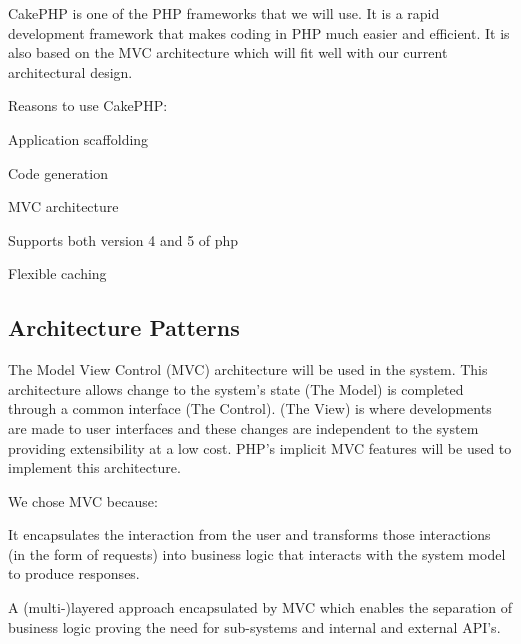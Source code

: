 \documentclass[a4paper,12pt]{report}
\begin{document}
\begin{description}
\item CakePHP is one of the PHP frameworks that we will use. It is a rapid development framework that makes coding in PHP much easier and efficient. It is also based on the MVC architecture which will fit well with our current architectural design. 
\item Reasons to use CakePHP:
\item[$\bullet$]Application scaffolding
\item[$\bullet$]Code generation
\item[$\bullet$] MVC architecture
\item[$\bullet$]Supports both version 4 and 5 of php
\item[$\bullet$]Flexible caching

\end{description}
\subsection{Architecture Patterns}
	\begin{description}
\item The Model View Control (MVC) architecture will be used in the system.
This architecture allows change to the system's state (The Model) is completed through a common interface (The Control). (The View) is where developments are made to user interfaces and these changes are independent to the system providing extensibility at a low cost.
PHP’s implicit MVC features will be used to implement this architecture. 
\item We chose MVC because:
\item[$\bullet$] It encapsulates the interaction from the user and transforms those interactions (in the form of requests) into business logic that interacts with the system model to produce responses. 
\item[$\bullet$] A (multi-)layered approach encapsulated by MVC which enables the separation of business logic proving the need for sub-systems and internal and external API’s.
\end{description}
\end{document}
